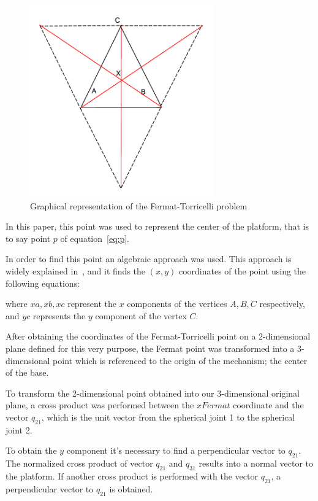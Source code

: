 \documentclass[titlepage, letterpaper, fleqn]{article}
\begin{document}
\begin{figure}[htbp]
    \centering
    \includegraphics[width=0.7\textwidth]{fig_fermat}
    \caption{Graphical representation of the Fermat-Torricelli problem}
    \label{fig:fermat_problem}
\end{figure}


In this paper, this point was used to represent the center of the platform, that is to say point $p$ of equation~\ref{eq:p}.

In order to find this point an algebraic approach was used.
This approach is widely explained in~\cite{Palacios-Velez2015}, and it finds the $(x,y)$ coordinates of the point using the following equations:



where $xa, xb, xc$ represent the $x$ components of the vertices $A,B,C$ respectively, and $yc$ represents the $y$ component of the vertex $C$.

After obtaining the coordinates of the Fermat-Torricelli point on a 2-dimensional plane defined for this very purpose, the Fermat point was transformed into a 3-dimensional point which is referenced to the origin of the mechanism; the center of the base.

To transform the 2-dimensional point obtained into our 3-dimensional original plane, a cross product was performed between the $xFermat$ coordinate and the vector $q_{21}$, which is the unit vector from the spherical joint 1 to the spherical joint 2.


To obtain the $y$ component it's necessary to find a perpendicular vector to $q_{21}$.
The normalized cross product of vector $q_{21}$ and $q_{31}$ results into a normal vector to the platform.
If another cross product is performed with the vector $q_{21}$, a perpendicular vector to $q_{21}$ is obtained.
\end{document}
